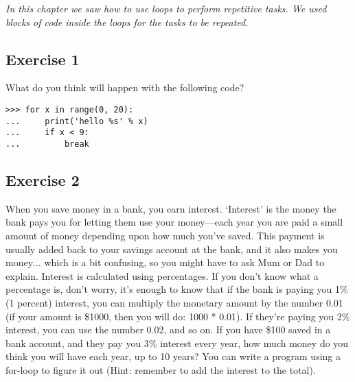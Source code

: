 \emph{In this chapter we saw how to use loops to perform repetitive tasks.  We used blocks of code inside the loops for the tasks to be repeated.}

\subsection*{Exercise 1}
What do you think will happen with the following code?

\begin{listing}
\begin{verbatim}
>>> for x in range(0, 20):
...     print('hello %s' % x)
...     if x < 9:
...         break
\end{verbatim}
\end{listing}

\subsection*{Exercise 2}
When you save money in a bank, you earn interest.  `Interest' is the money the bank pays you for letting them use your money---each year you are paid a small amount of money depending upon how much you've saved.  This payment is usually added back to your savings account at the bank, and it also makes you money$\ldots$ which is a bit confusing, so you might have to ask Mum or Dad to explain.
Interest is calculated using percentages.  If you don't know what a percentage is, don't worry, it's enough to know that if the bank is paying you 1\% (1 percent) interest, you can multiply the monetary amount by the number 0.01 (if your amount is \$1000, then you will do: 1000 * 0.01).  If they're paying you 2\% interest, you can use the number 0.02, and so on.  
If you have \$100 saved in a bank account, and they pay you 3\% interest every year, how much money do you think you will have each year, up to 10 years?  You can write a program using a for-loop to figure it out  (Hint: remember to add the interest to the total).
\newpage
